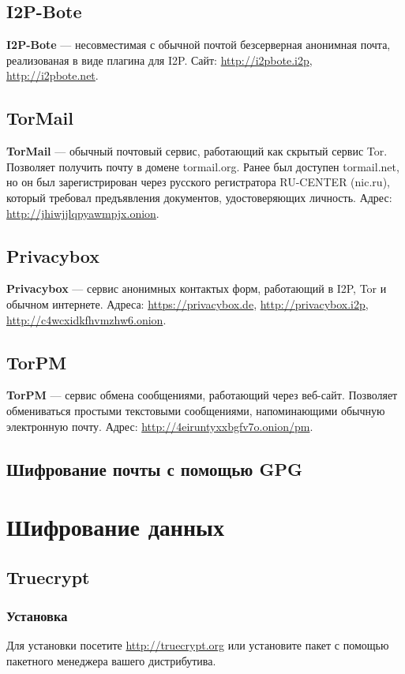 \subsection{I2P-Bote}
\textbf{I2P-Bote} --- несовместимая с обычной почтой безсерверная анонимная почта, реализованая в виде плагина для I2P. Сайт: \url{http://i2pbote.i2p}, \url{http://i2pbote.net}.
\subsection{TorMail}
\textbf{TorMail} --- обычный почтовый сервис, работающий как скрытый сервис Tor. Позволяет получить почту в домене tormail.org. Ранее был доступен tormail.net, но он был зарегистрирован через русского регистратора RU-CENTER (nic.ru), который требовал предъявления документов, удостоверяющих личность\cite{tormail}. Адрес: \url{http://jhiwjjlqpyawmpjx.onion}.
\subsection{Privacybox}
\textbf{Privacybox} --- сервис анонимных контактых форм, работающий в I2P, Tor и обычном интернете. Адреса: \url{https://privacybox.de}, \url{http://privacybox.i2p}, \url{http://c4wcxidkfhvmzhw6.onion}.
\subsection{TorPM}
\textbf{TorPM} --- сервис обмена сообщениями, работающий через веб-сайт. Позволяет обмениваться простыми текстовыми сообщениями, напоминающими обычную электронную почту. Адрес: \url{http://4eiruntyxxbgfv7o.onion/pm}.
\subsection{Шифрование почты с помощью GPG}

\section{Шифрование данных}
\subsection{Truecrypt}
\subsubsection{Установка}
Для установки посетите \url{http://truecrypt.org} или установите пакет с помощью пакетного менеджера вашего дистрибутива.
